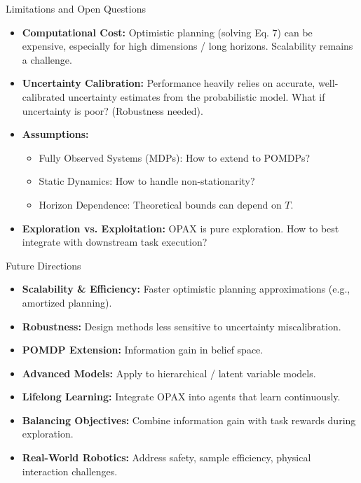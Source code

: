 \documentclass[11pt,aspectratio=169,handout]{beamer} %
\begin{document}
\begin{frame}{Limitations and Open Questions}
    \begin{itemize}
        \item \textbf{Computational Cost:} Optimistic planning (solving Eq. 7) can be expensive, especially for high dimensions / long horizons. Scalability remains a challenge.
        \pause
        \item \textbf{Uncertainty Calibration:} Performance heavily relies on accurate, well-calibrated uncertainty estimates from the probabilistic model. What if uncertainty is poor? (Robustness needed).
        \pause
        \item \textbf{Assumptions:}
        \begin{itemize}
            \item Fully Observed Systems (MDPs): How to extend to POMDPs?
            \item Static Dynamics: How to handle non-stationarity?
            \item Horizon Dependence: Theoretical bounds can depend on $T$.
        \end{itemize}
        \pause
        \item \textbf{Exploration vs. Exploitation:} OPAX is pure exploration. How to best integrate with downstream task execution?
    \end{itemize}
\end{frame}

\begin{frame}{Future Directions}
    \begin{itemize}
        \item \textbf{Scalability \& Efficiency:} Faster optimistic planning approximations (e.g., amortized planning).
        \item \textbf{Robustness:} Design methods less sensitive to uncertainty miscalibration.
        \item \textbf{POMDP Extension:} Information gain in belief space.
        \item \textbf{Advanced Models:} Apply to hierarchical / latent variable models.
        \item \textbf{Lifelong Learning:} Integrate OPAX into agents that learn continuously.
        \item \textbf{Balancing Objectives:} Combine information gain with task rewards during exploration.
        \item \textbf{Real-World Robotics:} Address safety, sample efficiency, physical interaction challenges.
    \end{itemize}
\end{frame}
\end{document}
